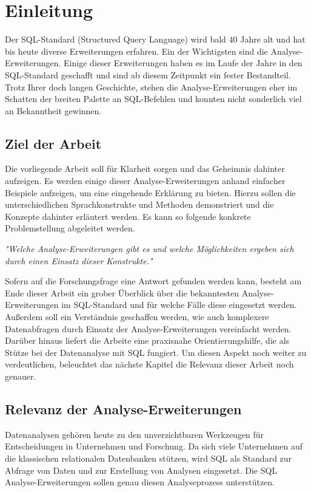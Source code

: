 \chapter{Einleitung}
\label{chap:einleitung} Der SQL-Standard (Structured Query Language) wird bald 40
Jahre alt und hat bis heute diverse Erweiterungen erfahren. Ein der Wichtigsten
sind die Analyse-Erweiterungen. Einige dieser Erweiterungen haben es im Laufe der
Jahre in den SQL-Standard geschafft und sind ab diesem Zeitpunkt ein fester Bestandteil.
Trotz Ihrer doch langen Geschichte, stehen die Analyse-Erweiterungen eher im Schatten
der breiten Palette an SQL-Befehlen und konnten nicht sonderlich viel an Bekanntheit
gewinnen.

\section{Ziel der Arbeit}
\label{sec:ziel_der_arbeit} Die vorliegende Arbeit soll für Klarheit sorgen und das
Geheimnis dahinter aufzeigen. Es werden einige dieser Analyse-Erweiterungen
anhand einfacher Beispiele aufzeigen, um eine eingehende Erklärung zu bieten.
Hierzu sollen die unterschiedlichen Sprachkonstrukte und Methoden demonstriert
und die Konzepte dahinter erläutert werden. Es kann so folgende konkrete Problemstellung
abgeleitet werden.
\begin{center}
	\textit{"Welche Analyse-Erweiterungen gibt es und welche Möglichkeiten ergeben
	sich durch einen Einsatz dieser Konstrukte."}
\end{center}
Sofern auf die Forschungsfrage eine Antwort gefunden werden kann, besteht am Ende
dieser Arbeit ein grober Überblick über die bekanntesten Analyse-Erweiterungen im
SQL-Standard und für welche Fälle diese eingesetzt werden. Außerdem soll ein
Verständnis geschaffen werden, wie auch komplexere Datenabfragen durch Einsatz der
Analyse-Erweiterungen vereinfacht werden. Darüber hinaus liefert die Arbeite
eine praxisnahe Orientierungshilfe, die als Stütze bei der Datenanalyse mit SQL fungiert.
Um diesen Aspekt noch weiter zu verdeutlichen, beleuchtet das nächste Kapitel die
Relevanz dieser Arbeit noch genauer.

\section{Relevanz der Analyse-Erweiterungen}
\label{sec:relevant} Datenanalysen gehören heute zu den unverzichtbaren Werkzeugen
für Entscheidungen in Unternehmen und Forschung. Da sich viele Unternehmen auf
die klassischen relationalen Datenbanken stützen, wird SQL als Standard zur Abfrage
von Daten und zur Erstellung von Analysen eingesetzt. Die SQL Analyse-Erweiterungen
sollen genau diesen Analyseprozess unterstützen.

